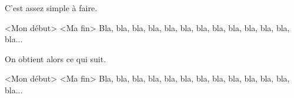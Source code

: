 C'est assez simple à faire.

\begin{bdoclatex}[code]
\begin{bdocshowcase}<Mon début>%
                    <Ma fin>
    Bla, bla, bla, bla, bla, bla, bla, bla, bla, bla, bla, bla, bla...
\end{bdocshowcase}
\end{bdoclatex}

On obtient alors ce qui suit.

\medskip

\begin{bdocshowcase}<Mon début>%
                    <Ma fin>
    Bla, bla, bla, bla, bla, bla, bla, bla, bla, bla, bla, bla, bla...
\end{bdocshowcase}


